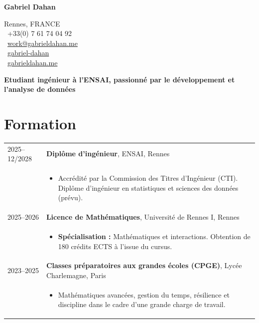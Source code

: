 \documentclass[11pt,a4paper]{article}
\begin{document}
\begin{minipage}[b]{0.6\textwidth}
    {\Huge \textbf{Gabriel Dahan}}
\end{minipage}
\hfill
\begin{minipage}[b]{0.35\textwidth}
    \raggedleft \small
    Rennes, FRANCE \\
    \faPhone \ +33(0) 7 61 74 04 92 \\
    \faEnvelope \ \href{mailto:work@gabrieldahan.me}{work@gabrieldahan.me} \\
    \faLinkedin \ \href{https://www.linkedin.com/in/gabriel-dahan/}{gabriel-dahan} \\
    \faGlobe \ \href{https://gabrieldahan.me/}{gabrieldahan.me}
\end{minipage}

\vspace{0.6cm}

\textbf{Etudiant ingénieur à l'ENSAI, passionné par le développement et l'analyse de données}

\vspace{0.4cm}

\section*{Formation}

\begin{tabularx}{\textwidth}{@{}p{2.5cm} X@{}}
2025--12/2028 & \textbf{Diplôme d'ingénieur}, ENSAI, Rennes \\
& \vspace{-0.2cm}
  \begin{itemize}[leftmargin=0.4cm, itemsep=1pt, topsep=0pt]
    \item Accrédité par la Commission des Titres d'Ingénieur (CTI). Diplôme d'ingénieur en statistiques et sciences des données (prévu).
  \end{itemize} \\

2025--2026 & \textbf{Licence de Mathématiques}, Université de Rennes I, Rennes \\
& \vspace{-0.2cm}
  \begin{itemize}[leftmargin=0.4cm, itemsep=1pt, topsep=0pt]
    \item \textbf{Spécialisation :} Mathématiques et interactions. Obtention de 180 crédits ECTS à l'issue du cursus.
  \end{itemize} \\

2023--2025 & \textbf{Classes préparatoires aux grandes écoles (CPGE)}, Lycée Charlemagne, Paris \\
& \vspace{-0.2cm}
  \begin{itemize}[leftmargin=0.4cm, itemsep=1pt, topsep=0pt]
    \item Mathématiques avancées, gestion du temps, résilience et discipline dans le cadre d'une grande charge de travail.
  \end{itemize} \\
\end{tabularx}
\end{document}
